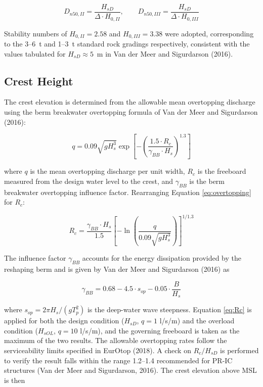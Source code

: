 \documentclass[a4paper, 11pt]{article}
\begin{document}
\begin{equation}
    D_{n50,II} = \frac{H_{sD}}{\Delta \cdot H_{0,II}}, \qquad D_{n50,III} = \frac{H_{sD}}{\Delta \cdot H_{0,III}}
    \label{eq:dn50_IIIII}
\end{equation}

Stability numbers of $H_{0,II} = 2.58$ and $H_{0,III} = 3.38$ were adopted, corresponding to the 3--6~t and 1--3~t standard rock gradings respectively, consistent with the values tabulated for $H_{sD} \approx 5$~m in Van der Meer and Sigurdarson (2016).

\subsection{Crest Height}
\hspace{0.5cm}The crest elevation is determined from the allowable mean overtopping discharge using the berm breakwater overtopping formula of Van der Meer and Sigurdarson (2016):

\begin{equation}
    q = 0.09 \sqrt{g H_s^3} \exp\left[-\left(\frac{1.5 \cdot R_c}{\gamma_{BB} \cdot H_s}\right)^{1.3}\right]
    \label{eq:overtopping}
\end{equation}

where $q$ is the mean overtopping discharge per unit width, $R_c$ is the freeboard measured from the design water level to the crest, and $\gamma_{BB}$ is the berm breakwater overtopping influence factor. Rearranging Equation \ref{eq:overtopping} for $R_c$:

\begin{equation}
    R_c = \frac{\gamma_{BB} \cdot H_s}{1.5} \left[-\ln\left(\frac{q}{0.09\sqrt{g H_s^3}}\right)\right]^{1/1.3}
    \label{eq:Rc}
\end{equation}

The influence factor $\gamma_{BB}$ accounts for the energy dissipation provided by the reshaping berm and is given by Van der Meer and Sigurdarson (2016) as

\begin{equation}
    \gamma_{BB} = 0.68 - 4.5 \cdot s_{op} - 0.05 \cdot \frac{B}{H_s}
    \label{eq:gammaBB}
\end{equation}

where $s_{op} = 2\pi H_s / (g T_p^2)$ is the deep-water wave steepness. Equation \ref{eq:Rc} is applied for both the design condition ($H_{sD}$, $q = 1$ l/s/m) and the overload condition ($H_{sOL}$, $q = 10$ l/s/m), and the governing freeboard is taken as the maximum of the two results. The allowable overtopping rates follow the serviceability limits specified in EurOtop (2018). A check on $R_c/H_{sD}$ is performed to verify the result falls within the range 1.2--1.4 recommended for PR-IC structures (Van der Meer and Sigurdarson, 2016). The crest elevation above MSL is then
\end{document}

